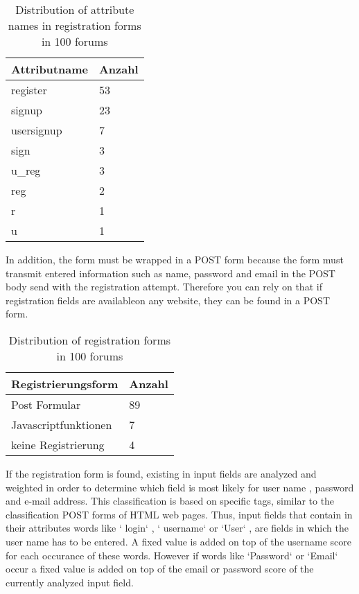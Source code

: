 \begin{table}[h!]
\centering 
\begin{tabular}{ | p{3cm} | p{3cm}|} \hline
Attributname & Anzahl \\ \hline
register & 53 \\ \hline
signup & 23 \\ \hline
usersignup & 7 \\ \hline
sign & 3 \\ \hline
u\_reg & 3 \\ \hline
reg & 2 \\ \hline
r & 1 \\ \hline
u & 1 \\ \hline
\end{tabular}
\caption{Distribution of attribute names in registration forms in 100 forums}
\end{table}

In addition, the form must be wrapped in a POST form because the form must transmit entered information such as name, password and email in the POST body send with the registration attempt. Therefore you can rely on that if registration fields are availableon any website, they can be found in a POST form.

\begin{table}[h!]
\centering 
\begin{tabular}{ | p{5cm} | p{3cm}|} \hline
Registrierungsform & Anzahl \\ \hline
Post Formular & 89 \\ \hline
Javascriptfunktionen & 7 \\ \hline
keine Registrierung & 4 \\ \hline
\end{tabular}
\caption{Distribution of registration forms in 100 forums}
\end{table}

If the registration form is found, existing in input fields are analyzed and weighted in order to determine which field is most likely for user name , password and e-mail address. This classification is based on specific tags, similar to the classification POST forms of HTML web pages.
Thus, input fields that contain in their attributes words like ` login` , ` username` or `User` , are fields in which the user name has to be entered. A fixed value is added on top of the username score  for each occurance of these words. However if words like `Password` or `Email` occur a fixed value is added on top of the email or password score of the currently analyzed input field.

